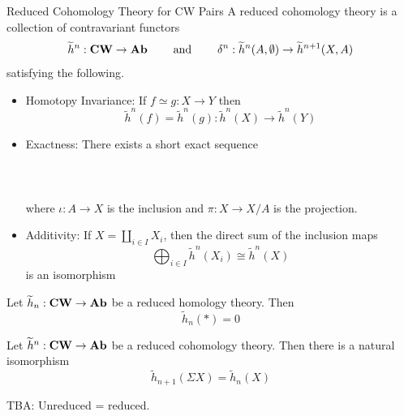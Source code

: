 \documentclass[a4paper]{article}
\begin{document}
\begin{defn}{Reduced Cohomology Theory for CW Pairs}{} A reduced cohomology theory is a collection of contravariant functors $$\widetilde{h}^n:\bold{CW}\to\bold{Ab}\;\;\;\;\;\;\;\text{ and }\;\;\;\;\;\;\;\delta^n:\widetilde{h}^n(A,\emptyset)\to\widetilde{h}^{n+1}(X,A)$$ satisfying the following. 
\begin{itemize}
\item Homotopy Invariance: If $f\simeq g:X\to Y$ then $$\widetilde{h}^n(f)=\widetilde{h}^n(g):\widetilde{h}^n(X)\to\widetilde{h}^n(Y)$$
\item Exactness: There exists a short exact sequence \\~\\
\\~\\
where $\iota:A\to X$ is the inclusion and $\pi:X\to X/A$ is the projection. 
\item Additivity: If $X=\coprod_{i\in I}X_i$, then the direct sum of the inclusion maps $$\bigoplus_{i\in I}\widetilde{h}^n(X_i)\cong\widetilde{h}^n(X)$$ is an isomorphism
\end{itemize}
\end{defn}

\begin{lmm}{}{} Let $\widetilde{h}_n:\bold{CW}\to\bold{Ab}$ be a reduced homology theory. Then $$\widetilde{h}_n(\ast)=0$$
\end{lmm}

\begin{prp}{}{} Let $\widetilde{h}^n:\bold{CW}\to\bold{Ab}$ be a reduced cohomology theory. Then there is a natural isomorphism $$\widetilde{h}_{n+1}(\Sigma X)=\widetilde{h}_n(X)$$
\end{prp}

TBA: Unreduced = reduced. 
\end{document}
